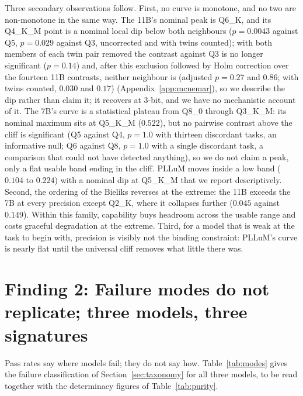 \documentclass[11pt]{article}
\begin{document}
Three secondary observations follow. First, no curve is monotone, and no two are non-monotone in the same way. The 11B's nominal peak is Q6\_K, and its Q4\_K\_M point is a nominal local dip below both neighbours ($p=0.0043$ against Q5, $p=0.029$ against Q3, uncorrected and with twins counted); with both members of each twin pair removed the contrast against Q3 is no longer significant ($p=0.14$) and, after this exclusion followed by Holm correction over the fourteen 11B contrasts, neither neighbour is (adjusted $p=0.27$ and $0.86$; with twins counted, $0.030$ and $0.17$) (Appendix~\ref{app:mcnemar}), so we describe the dip rather than claim it; it recovers at 3-bit, and we have no mechanistic account of it. The 7B's curve is a statistical plateau from Q8\_0 through Q3\_K\_M: its nominal maximum sits at Q5\_K\_M ($0.522$), but no pairwise contrast above the cliff is significant (Q5 against Q4, $p=1.0$ with thirteen discordant tasks, an informative null; Q6 against Q8, $p=1.0$ with a single discordant task, a comparison that could not have detected anything), so we do not claim a peak, only a flat usable band ending in the cliff. PLLuM moves inside a low band ($0.104$ to $0.224$) with a nominal dip at Q5\_K\_M that we report descriptively. Second, the ordering of the Bieliks reverses at the extreme: the 11B exceeds the 7B at every precision except Q2\_K, where it collapses further ($0.045$ against $0.149$). Within this family, capability buys headroom across the usable range and costs graceful degradation at the extreme. Third, for a model that is weak at the task to begin with, precision is visibly not the binding constraint: PLLuM's curve is nearly flat until the universal cliff removes what little there was.

\section{Finding 2: Failure modes do not replicate; three models, three signatures}
\label{sec:f2}

Pass rates say where models fail; they do not say how. Table~\ref{tab:modes} gives the failure classification of Section~\ref{sec:taxonomy} for all three models, to be read together with the determinacy figures of Table~\ref{tab:purity}.
\end{document}
